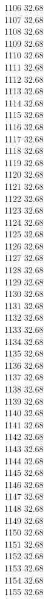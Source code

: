 1106	32.68\\
1107	32.68\\
1108	32.68\\
1109	32.68\\
1110	32.68\\
1111	32.68\\
1112	32.68\\
1113	32.68\\
1114	32.68\\
1115	32.68\\
1116	32.68\\
1117	32.68\\
1118	32.68\\
1119	32.68\\
1120	32.68\\
1121	32.68\\
1122	32.68\\
1123	32.68\\
1124	32.68\\
1125	32.68\\
1126	32.68\\
1127	32.68\\
1128	32.68\\
1129	32.68\\
1130	32.68\\
1131	32.68\\
1132	32.68\\
1133	32.68\\
1134	32.68\\
1135	32.68\\
1136	32.68\\
1137	32.68\\
1138	32.68\\
1139	32.68\\
1140	32.68\\
1141	32.68\\
1142	32.68\\
1143	32.68\\
1144	32.68\\
1145	32.68\\
1146	32.68\\
1147	32.68\\
1148	32.68\\
1149	32.68\\
1150	32.68\\
1151	32.68\\
1152	32.68\\
1153	32.68\\
1154	32.68\\
1155	32.68\\
